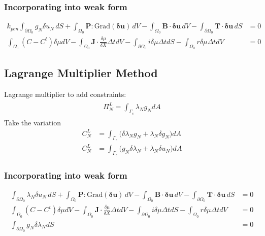 \documentclass[12pt,3p]{article}
\begin{document}
\subsubsection{Incorporating into weak form}
\begin{align*}
k_{pen} \int_{\partial \Omega_0} g_N\delta u_N \, dS +\int_{\Omega_0} \mathbf{P} : \text{Grad}(\pmb{\delta} \mathbf{u} ) \, dV - \int_{\Omega_0} \mathbf{B} \cdot \pmb{\delta} \mathbf{u} \, dV - \int_{\partial \Omega_0} \mathbf{T} \cdot \pmb{\delta} \mathbf{u} \, dS  &= 0 \\
 \int_{\Omega_0} \left(C-C^{t}\right) \delta \mu d V-\int_{\Omega_0} \mathbf{J} \cdot \frac{\delta \mu}{\delta X} \Delta t d V - \int_{\partial \Omega_0} i \delta \mu \Delta t d S-\int_{\Omega_0} r \delta \mu \Delta t d V &=0 
 \end{align*}


\subsection{Lagrange Multiplier Method}
Lagrange multiplier to add constraints: 
\begin{align*}
\begin{split}
\Pi_N^{L} = \int_{\Gamma_c} \lambda_N g_{N} dA 
\end{split}
\end{align*}
Take the variation
\begin{align*}
C_N^L &= \int_{\Gamma_c} \big( \delta \lambda_N g_N + \lambda_N \delta g_N \big) dA \\
C_N^L &=  \int_{\Gamma_c} \big( g_N \delta \lambda_N + \lambda_N \delta u_N \big) dA
\end{align*}

\subsubsection{Incorporating into weak form}
\begin{align*}
\int_{\partial \Omega_0} \lambda_N \delta u_N \, dS +\int_{\Omega_0} \mathbf{P} : \text{Grad}(\pmb{\delta} \mathbf{u} ) \, dV - \int_{\Omega_0} \mathbf{B} \cdot \pmb{\delta} \mathbf{u} \, dV - \int_{\partial \Omega_0} \mathbf{T} \cdot \pmb{\delta} \mathbf{u} \, dS  &= 0 \\
 \int_{\Omega_0} \left(C-C^{t}\right) \delta \mu d V-\int_{\Omega_0} \mathbf{J} \cdot \frac{\delta \mu}{\delta X} \Delta t d V - \int_{\partial \Omega_0} i \delta \mu \Delta t d S-\int_{\Omega_0} r \delta \mu \Delta t d V &=0 \\
 \int_{\partial \Omega_0} g_N \delta \lambda_N dS &= 0 
 \end{align*}
\end{document}
